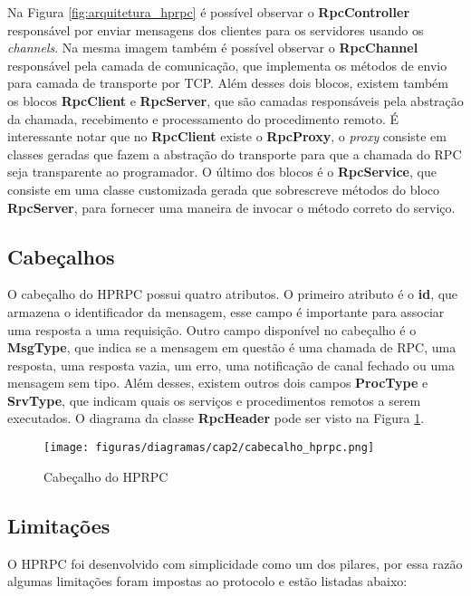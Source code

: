 Na Figura \ref{fig:arquitetura_hprpc} é possível observar o \textbf{RpcController} responsável por enviar mensagens dos clientes para os servidores usando os \textit{channels}. Na mesma imagem também é possível observar o \textbf{RpcChannel} responsável pela camada de comunicação, que implementa os métodos de envio para camada de transporte por TCP. Além desses dois blocos, existem também os blocos \textbf{RpcClient} e \textbf{RpcServer}, que são camadas responsáveis pela abstração da chamada, recebimento e processamento do procedimento remoto. É interessante notar que no \textbf{RpcClient} existe o \textbf{RpcProxy}, o \textit{proxy} consiste em classes geradas que fazem a abstração do transporte para que a chamada do RPC seja transparente ao programador. O último dos blocos é o \textbf{RpcService}, que consiste em uma classe customizada gerada que sobrescreve métodos do bloco \textbf{RpcServer}, para fornecer uma maneira de invocar o método correto do serviço.

\subsection{Cabeçalhos}

O cabeçalho do HPRPC possui quatro atributos. O primeiro atributo é o \textbf{id}, que armazena o identificador da mensagem, esse campo é importante para associar uma resposta a uma requisição. Outro campo disponível no cabeçalho é o \textbf{MsgType}, que indica se a mensagem em questão é uma chamada de RPC, uma resposta, uma resposta vazia, um erro, uma notificação de canal fechado ou uma mensagem sem tipo. Além desses, existem outros dois campos \textbf{ProcType} e \textbf{SrvType}, que indicam quais os serviços e procedimentos remotos a serem executados. O diagrama da classe \textbf{RpcHeader} pode ser visto na Figura \ref{fig:cabecalho_hprpc}.

\begin{figure}[ht]
    \centering
    \caption{Cabeçalho do HPRPC}
    \texttt{[image: figuras/diagramas/cap2/cabecalho\_hprpc.png]} 
    \label{fig:cabecalho_hprpc}
\end{figure}

\subsection{Limitações}

O HPRPC foi desenvolvido com simplicidade como um dos pilares, por essa razão algumas limitações foram impostas ao protocolo e estão listadas abaixo:

